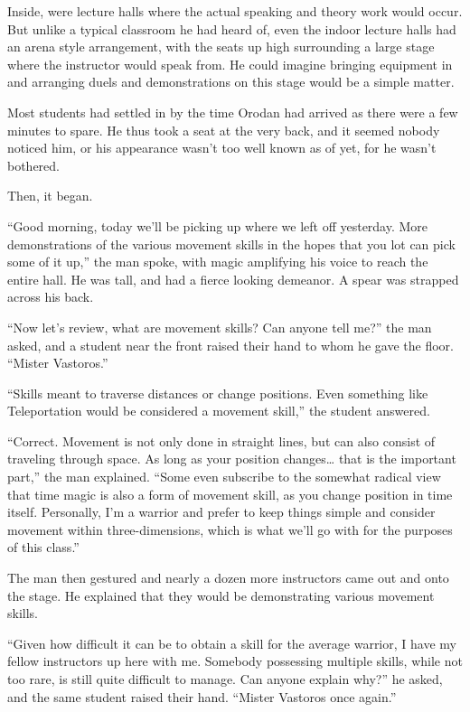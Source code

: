 \documentclass[a4paper,10pt]{book}
\begin{document}
Inside, were lecture halls where the actual speaking and theory work would occur. But unlike a typical classroom he had heard of, even the indoor lecture halls had an arena style arrangement, with the seats up high surrounding a large stage where the instructor would speak from. He could imagine bringing equipment in and arranging duels and demonstrations on this stage would be a simple matter.\par
Most students had settled in by the time Orodan had arrived as there were a few minutes to spare. He thus took a seat at the very back, and it seemed nobody noticed him, or his appearance wasn’t too well known as of yet, for he wasn’t bothered.\par
Then, it began.\par
“Good morning, today we’ll be picking up where we left off yesterday. More demonstrations of the various movement skills in the hopes that you lot can pick some of it up,” the man spoke, with magic amplifying his voice to reach the entire hall. He was tall, and had a fierce looking demeanor. A spear was strapped across his back.\par
“Now let’s review, what are movement skills? Can anyone tell me?” the man asked, and a student near the front raised their hand to whom he gave the floor. “Mister Vastoros.”\par
“Skills meant to traverse distances or change positions. Even something like Teleportation would be considered a movement skill,” the student answered.\par
“Correct. Movement is not only done in straight lines, but can also consist of traveling through space. As long as your position changes… that is the important part,” the man explained. “Some even subscribe to the somewhat radical view that time magic is also a form of movement skill, as you change position in time itself. Personally, I’m a warrior and prefer to keep things simple and consider movement within three-dimensions, which is what we’ll go with for the purposes of this class.”\par
The man then gestured and nearly a dozen more instructors came out and onto the stage. He explained that they would be demonstrating various movement skills.\par
“Given how difficult it can be to obtain a skill for the average warrior, I have my fellow instructors up here with me. Somebody possessing multiple skills, while not too rare, is still quite difficult to manage. Can anyone explain why?” he asked, and the same student raised their hand. “Mister Vastoros once again.”\par
\end{document}
